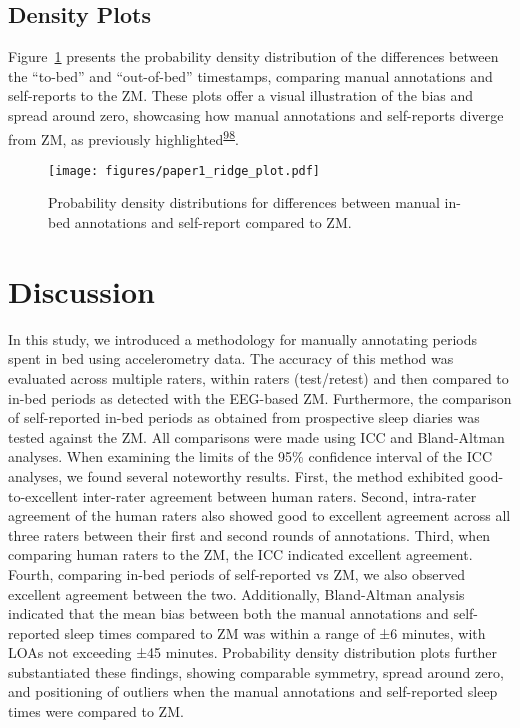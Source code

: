\documentclass[
  10pt,
]{scrbook}
\begin{document}
\hypertarget{density-plots}{%
\subsection{Density Plots}\label{density-plots}}

Figure~\ref{fig-ridge_plot} presents the probability density
distribution of the differences between the ``to-bed'' and
``out-of-bed'' timestamps, comparing manual annotations and self-reports
to the ZM. These plots offer a visual illustration of the bias and
spread around zero, showcasing how manual annotations and self-reports
diverge from ZM, as previously
highlighted\textsuperscript{\protect\hyperlink{ref-van_hees_estimating_2018}{98}}.

\begin{figure}

{\centering \texttt{[image: figures/paper1\_ridge\_plot.pdf]}

}

\caption{\label{fig-ridge_plot}Probability density distributions for
differences between manual in-bed annotations and self-report compared
to ZM.}

\end{figure}

\hypertarget{discussion}{%
\section{Discussion}\label{discussion}}

In this study, we introduced a methodology for manually annotating
periods spent in bed using accelerometry data. The accuracy of this
method was evaluated across multiple raters, within raters (test/retest)
and then compared to in-bed periods as detected with the EEG-based ZM.
Furthermore, the comparison of self-reported in-bed periods as obtained
from prospective sleep diaries was tested against the ZM. All
comparisons were made using ICC and Bland-Altman analyses. When
examining the limits of the 95\% confidence interval of the ICC
analyses, we found several noteworthy results. First, the method
exhibited good-to-excellent inter-rater agreement between human raters.
Second, intra-rater agreement of the human raters also showed good to
excellent agreement across all three raters between their first and
second rounds of annotations. Third, when comparing human raters to the
ZM, the ICC indicated excellent agreement. Fourth, comparing in-bed
periods of self-reported vs ZM, we also observed excellent agreement
between the two. Additionally, Bland-Altman analysis indicated that the
mean bias between both the manual annotations and self-reported sleep
times compared to ZM was within a range of ±6 minutes, with LOAs not
exceeding ±45 minutes. Probability density distribution plots further
substantiated these findings, showing comparable symmetry, spread around
zero, and positioning of outliers when the manual annotations and
self-reported sleep times were compared to ZM.
\end{document}
